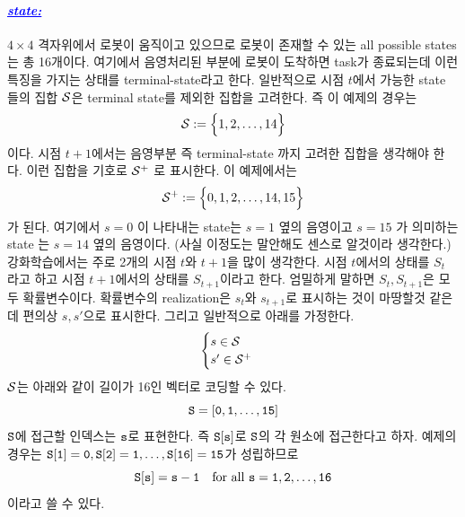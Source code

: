 \documentclass[12pt,oneside,english,a4paper]{article}
\newcommand{\parablue}[1]{\paragraph{\Large\textcolor{blue}{\it\underline{\textbf{#1:}}}}\Large}
\begin{document}
\parablue{state} $4\times 4$ 격자위에서 로봇이 움직이고 있으므로 로봇이 존재할 수 있는 all possible states 는 총 16개이다. 여기에서 음영처리된 부분에 로봇이 도착하면 task가 종료되는데 이런 특징을 가지는 상태를 terminal-state라고 한다. 일반적으로 시점 $t$에서 가능한 state 들의 집합 ${\cal S}$은 terminal state를 제외한 집합을 고려한다. 즉 이 예제의 경우는 
\begin{align*}
{\cal S}:=\Big\{1,2,\dots,14\Big\}
\end{align*}
이다. 시점 $t+1$에서는 음영부분 즉 terminal-state 까지 고려한 집합을 생각해야 한다. 이런 집합을 기호로 ${\cal S}^+$ 로 표시한다. 이 예제에서는 
\begin{align*}
{\cal S}^+:=\Big\{0,1,2,\dots,14,15\Big\}
\end{align*}
가 된다. 여기에서 $s=0$ 이 나타내는 state는 $s=1$ 옆의 음영이고 $s=15$ 가 의미하는 state 는 $s=14$ 옆의 음영이다. (사실 이정도는 말안해도 센스로 알것이라 생각한다.) 강화학습에서는 주로 2개의 시점 $t$와 $t+1$을 많이 생각한다. 시점 $t$에서의 상태를 $S_t$ 라고 하고 시점 $t+1$에서의 상태를 $S_{t+1}$이라고 한다. 엄밀하게 말하면 $S_t, S_{t+1}$은 모두 확률변수이다. 확률변수의 realization은 $s_t$와 $s_{t+1}$로 표시하는 것이 마땅할것 같은데 편의상 $s,s'$으로 표시한다. 그리고 일반적으로 아래를 가정한다. 
\begin{align*}
\begin{cases}
s \in {\cal S} \\
s' \in {\cal S}^+
\end{cases}
\end{align*}
${\cal S}$는 아래와 같이 길이가 16인 벡터로 코딩할 수 있다. 
\[
\tt{S=[0,1,\dots,15]}
\]
$\tt S$에 접근할 인덱스는 $\tt s$로 표현한다. 즉 $\tt S[s]$로 $\tt S$의 각 원소에 접근한다고 하자. 예제의 경우는 $\tt S[1]=0, S[2]=1,\dots, S[16]=15$가 성립하므로 
\[
\tt{S[s]=s-1} \quad \mbox{for all } \tt{s=1,2,\dots,16}
\]
이라고 쓸 수 있다. 
\end{document}
